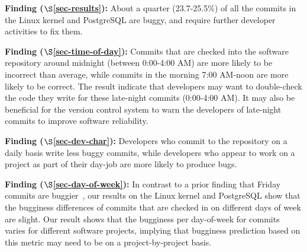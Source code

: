\begin{list}{}{\topsep=0pt\parsep=0pt\leftmargin=9pt\itemindent=0pt}

\item {\bf Finding \fbuggy ($\S$\ref{sec-results}):} 
About a quarter (23.7-25.5\%) of all the commits in the Linux kernel and PostgreSQL are buggy, 
and require further developer activities to fix them.

\item {\bf Finding \fhour ($\S$\ref{sec-time-of-day}):} 
Commits that are checked into the software repository around midnight (between 0:00-4:00 AM) 
are more likely to be incorrect than average, while commits in the morning 7:00 AM-noon 
are more likely to be correct.
The result indicate that developers may want to double-check the code they write for these 
late-night commits (0:00-4:00 AM).
It may also be beneficial for the version control
system to warn the developers of late-night commits to improve software reliability. 


\item {\bf Finding \fdaily ($\S$\ref{sec-dev-char}):} 
Developers who commit to the repository on a daily basis
write less buggy commits, while developers who appear to work on a project
as part of their day-job are more likely to produce
bugs.

\item {\bf Finding \fday ($\S$\ref{sec-day-of-week}):} 
In contrast to a prior finding that Friday commits are buggier~\cite{sliwerski-msr-2005}, 
our results on the Linux kernel and PostgreSQL show that 
the bugginess differences of commits that are checked in on different days of week 
are slight. Our result shows that the bugginess per day-of-week for commits
varies for different software projects, implying that bugginess prediction based on this 
metric may need to be on a project-by-project basis.

\end{list}


